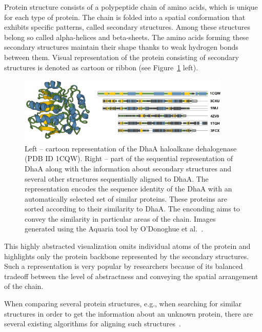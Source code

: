 \documentclass[twocolumn]{bmcart}%
\begin{document}
Protein structure consists of a polypeptide chain of amino acids, which is unique for each type of protein. 
The chain is folded into a spatial conformation that exhibits specific patterns, called secondary structures.
Among these structures belong so called alpha-helices and beta-sheets. 
The amino acids forming these secondary structures maintain their shape thanks to weak hydrogen bonds between them.
Visual representation of the protein consisting of secondary structures is denoted as cartoon or ribbon (see Figure~\ref{fig:aquaria} left).


\begin{figure}[th]
  \centering
  \includegraphics[width=0.9\textwidth]{pics/aquaria2.png}
  \caption{Left -- cartoon representation of the DhaA haloalkane dehalogenase (PDB ID 1CQW). Right -- part of the sequential representation of DhaA along with the information about secondary structures and several other structures sequentially aligned to DhaA. The representation encodes the sequence identity of the DhaA with an automatically selected set of similar proteins. These proteins are sorted according to their similarity to DhaA. The enconding aims to convey the similarity in particular areas of the chain. Images generated using the Aquaria tool by O'Donoghue et al.~\cite{odonoghue2015}.}
  \label{fig:aquaria}
\end{figure}

This highly abstracted visualization omits individual atoms of the protein and highlights only the protein backbone represented by the secondary structures.
Such a representation is very popular by researchers because of its balanced tradeoff between the level of abstractness and conveying the spatial arrangement of the chain.

When comparing several protein structures, e.g., when searching for similar structures in order to get the information about an unknown protein, there are several existing algorithms for aligning such structures~\cite{dali,Shindyalov1998,ssap,tmalign,promals3d}.
\end{document}

